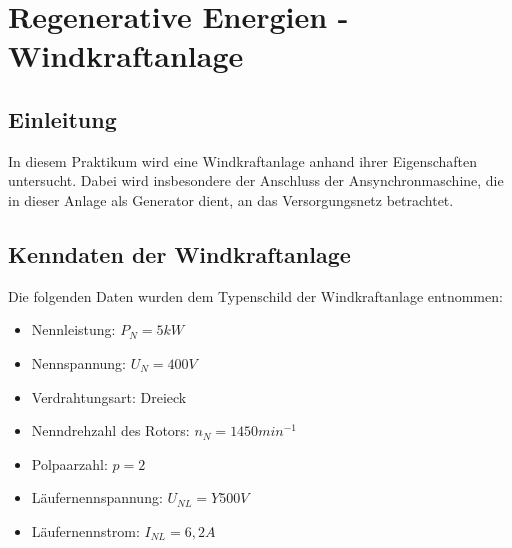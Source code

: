 \documentclass{report}
\begin{document}

\newpage

\tableofcontents

\listoffigures

\newpage

\listoftables

\newpage

\chapter{Regenerative Energien - Windkraftanlage}
\section{Einleitung}

In diesem Praktikum wird eine Windkraftanlage anhand ihrer Eigenschaften untersucht. Dabei wird insbesondere der Anschluss der Ansynchronmaschine, die in dieser Anlage als Generator dient, an das Versorgungsnetz betrachtet.

\section{Kenndaten der Windkraftanlage}

Die folgenden Daten wurden dem Typenschild der Windkraftanlage entnommen:

\begin{itemize}
	\item Nennleistung: $P_{N} = 5kW$
	\item Nennspannung: $U_{N} = 400V$
	\item Verdrahtungsart: Dreieck
	\item Nenndrehzahl des Rotors: $n_{N} = 1450min^{-1}$
	\item Polpaarzahl: $p = 2$
	\item Läufernennspannung: $U_{NL} = Y500V$
	\item Läufernennstrom: $I_{NL} = 6,2A$
\end{itemize}
\end{document}
